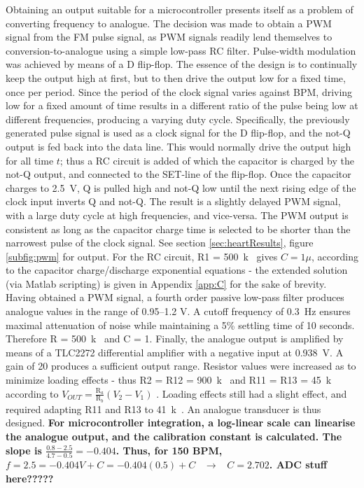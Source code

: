 Obtaining an output suitable for a microcontroller presents itself as a problem of converting frequency to analogue. The decision was made to obtain a PWM signal from the FM pulse signal, as PWM signals readily lend themselves to conversion-to-analogue using a simple low-pass RC filter. Pulse-width modulation was achieved by means of a D flip-flop. The essence of the design is to continually keep the output high at first, but to then drive the output low for a fixed time, once per period. Since the period of the clock signal varies against BPM, driving low for a fixed amount of time results in a different ratio of the pulse being low at different frequencies, producing a varying duty cycle. Specifically, the previously generated pulse signal is used as a clock signal for the D flip-flop, and the not-Q output is fed back into the data line. This would normally drive the output high for all time $t$; thus a RC circuit is added of which the capacitor is charged by the not-Q output, and connected to the SET-line of the flip-flop. Once the capacitor charges to \SI{2.5}{V}, Q is pulled high and not-Q low until the next rising edge of the clock input inverts Q and not-Q. The result is a slightly delayed PWM signal, with a large duty cycle at high frequencies, and vice-versa. The PWM output is consistent as long as the capacitor charge time is selected to be shorter than the narrowest pulse of the clock signal. See section \ref{sec:heartResults}, figure \ref{subfig:pwm} for output. For the RC circuit, R1 = \SI{500}{k\Omega} gives $C = 1\mu$, according to the capacitor charge/discharge exponential equations - the extended solution (via Matlab scripting) is given in Appendix \ref{app:C} for the sake of brevity. Having obtained a PWM signal, a fourth order passive low-pass filter produces analogue values in the range of \numrange{0.95}{1.2} \si{V}. A cutoff frequency of \SI{0.3}{Hz} ensures maximal attenuation of noise while maintaining a 5\% settling time of 10 seconds. Therefore R = \SI{500}{k\Omega} and C = \SI{1}{\mu}. Finally, the analogue output is amplified by means of a TLC2272 differential amplifier with a negative input at \SI{0.938}{V}. A gain of 20 produces a sufficient output range. Resistor values were increased as to minimize loading effects - thus R2 = R12 = \SI{900}{k\Omega} and R11 = R13 = \SI{45}{k\Omega} according to ${V}_{{OUT}}=\frac{\mathrm{R}_{a}}{\mathrm{R}_{b}}\left({V}_{2}-{V}_{1}\right)$ \cite{opamp}. Loading effects still had a slight effect, and required adapting R11 and R13 to \SI{41}{k\Omega}. An analogue transducer is thus designed. \textbf{For microcontroller integration, a log-linear scale can linearise the analogue output, and the calibration constant is calculated. The slope is $\frac{0.8-2.5}{4.7-0.5} = -0.404$. Thus, for 150 BPM, $f = 2.5 = -0.404V + C = -0.404(0.5) + C \;\;\; \rightarrow \;\;\; C = 2.702$. ADC stuff here?????}\\
